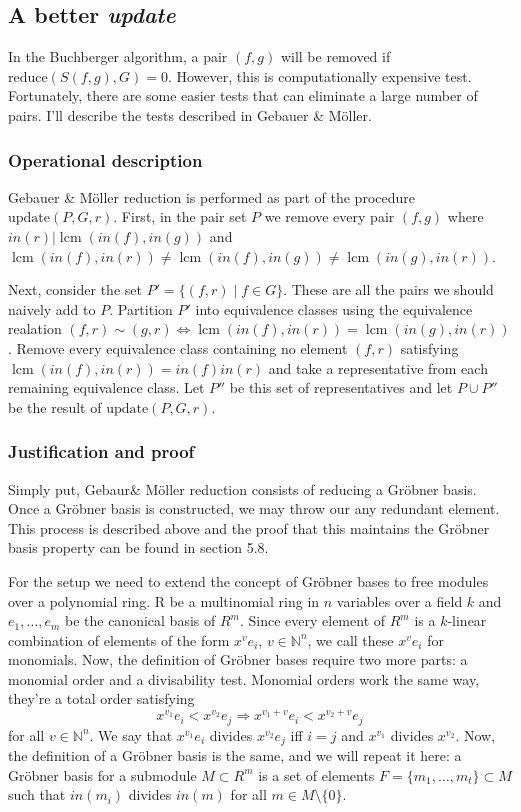 \documentclass{article}
\theoremstyle{changedot}
\theoremstyle{changedotbreak}
\theoremstyle{nonumberplain}
\newcommand{\m}{\mathbb}
\DeclareMathOperator{\lcm}{lcm}
\begin{document}
\subsection{A better \emph{update}}  \label{sec:update}
In the Buchberger algorithm, a pair $(f, g)$ will be removed if $\text{reduce}(S(f, g), G) = 0$. However, this is computationally expensive test. Fortunately, there are some easier tests that can eliminate a large number of pairs. I'll describe the tests described in Gebauer \& Möller.

\subsubsection{Operational description}
Gebauer \& Möller reduction is performed as part of the procedure $\text{update}(P, G, r)$. First, in the pair set $P$ we remove every pair $(f, g)$ where $in(r) | \lcm(in(f), in(g))$ and $\lcm(in(f), in(r)) \neq \lcm(in(f), in(g)) \neq \lcm(in(g), in(r))$.

Next, consider the set $P' = \{(f, r) \mid f \in G\}$. These are all the pairs we should naively add to $P$. Partition $P'$ into equivalence classes using the equivalence realation $(f, r) \sim (g, r) \Longleftrightarrow \lcm(in(f), in(r)) = \lcm(in(g), in(r))$. Remove every equivalence class containing no element $(f, r)$ satisfying $\lcm(in(f), in(r)) = in(f) in(r)$ and take a representative from each remaining equivalence class. Let $P''$ be this set of representatives and let $P \cup P''$ be the result of $\text{update}(P, G, r)$.


\subsubsection{Justification and proof}
Simply put, Gebaur\& Möller reduction consists of reducing a Gröbner basis. Once a Gröbner basis is constructed, we may throw our any redundant element. This process is described above and the proof that this maintains the Gröbner basis property can be found in \cite{NL} section 5.8.

For the setup we need to extend the concept of Gröbner bases to free modules over a polynomial ring. R be a multinomial ring in $n$ variables over a field $k$ and $e_{1}, \dots, e_{m}$ be the canonical basis of $R^{m}$. Since every element of $R^{m}$ is a $k$-linear combination of elements of the form $x^{v}e_{i}$, $v \in \m N^{n}$, we call these $x^{v}e_{i}$ for monomials. Now, the definition of Gröbner bases require two more parts: a monomial order and a divisability test. Monomial orders work the same way, they're a total order satisfying \[x^{v_{1}}e_i < x^{v_{2}}e_{j} \Longrightarrow x^{v_{1} + v} e_{i} < x^{v_{2} + v} e_{j}\] for all $v \in \m N^{n}$. We say that $x^{v_{1}}e_{i}$ divides $x^{v_{2}}e_{j}$ iff $i=j$ and $x^{v_{1}}$ divides $x^{v_{2}}$. Now, the definition of a Gröbner basis is the same, and we will repeat it here: a Gröbner basis for a submodule $M \subset R^{m}$ is a set of elements $F = \{m_{1}, \dots, m_{t}\} \subset M$ such that $in(m_{i})$ divides $in(m)$ for all $m \in M \setminus \{0\}$.
\end{document}
